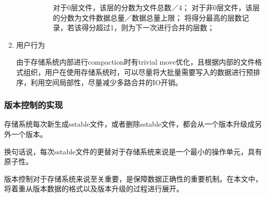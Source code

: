 \begin{enumerate}
\begin{enumerate}
\begin{enumerate}
\begin{enumerate}
	对于0层文件，该层的分数为文件总数／4；
	对于非0层文件，该层的分数为文件数据总量／数据总量上限；
	将得分最高的层数记录，若该得分超过1，则为下一次进行合并的层数；
				\end{enumerate}
				
				\end{enumerate}
				
				
				
			\end{enumerate}

			\item 用户行为
			
			由于存储系统内部进行compaction时有trivial move优化，且根据内部的文件格式组织，用户在使用存储系统时，可以尽量将大批量需要写入的数据进行预排序，利用空间局部性，尽量减少多路合并的IO开销。

		\end{enumerate}
		


		\subsubsection{版本控制的实现}

		存储系统每次新生成sstable文件，或者删除sstable文件，都会从一个版本升级成另外一个版本。

			换句话说，每次sstable文件的更替对于存储系统来说是一个最小的操作单元，具有原子性。

			版本控制对于存储系统来说至关重要，是保障数据正确性的重要机制。在本文中，将着重从版本数据的格式以及版本升级的过程进行展开。

